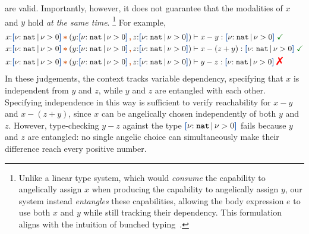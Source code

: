 are valid. Importantly, however, it does not guarantee that the
modalities of $x$ and $y$ hold \emph{at the same
  time}. \footnote{Unlike a linear type system, which would
  \emph{consume} the capability to angelically assign $x$ when
  producing the capability to angelically assign $y$, our system
  instead \emph{entangles} these capabilities, allowing the body
  expression $e$ to use both $x$ and $y$ while still tracking their
  dependency. This formulation aligns with the intuition of bunched
  typing~\cite{BunchedType}. %
}  For example,
\vspace{-0.2em}
\begin{align*}
  &x{:}\urt{\Nat}{\vnu > 0} \ctstar (y{:}\urt{\Nat}{\vnu > 0} \ctcomma z{:}\urt{\Nat}{\vnu > 0}) \vdash x - y : \urt{\Nat}{\vnu > 0} \;\judgok
  \\&x{:}\urt{\Nat}{\vnu > 0} \ctstar (y{:}\urt{\Nat}{\vnu > 0}
  \ctcomma z{:}\urt{\Nat}{\vnu > 0}) \vdash x - (z + y) : \urt{\Nat}{\vnu > 0} \;\judgok
  \\&x{:}\urt{\Nat}{\vnu > 0} \ctstar (y{:}\urt{\Nat}{\vnu > 0} \ctcomma z{:}\urt{\Nat}{\vnu > 0}) \vdash y - z : \urt{\Nat}{\vnu > 0} \;\judgfail
\end{align*}\noindent
In these judgements, the context tracks variable dependency,
specifying that $x$ is independent from $y$ and $z$, while $y$ and $z$
are entangled with each other.  Specifying independence in this way is
sufficient to verify reachability for $x - y$ and $x - (z + y)$, since
$x$ can be angelically chosen independently of both $y$ and $z$.
However, type-checking $y - z$ against the type $\urt{\Nat}{\vnu > 0}$
fails because $y$ and $z$ are entangled: no single angelic choice can
simultaneously make their difference reach every positive number.


